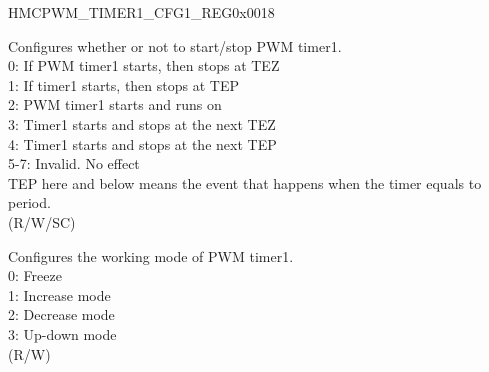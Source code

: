 \begin{register}{H}{MCPWM\_TIMER1\_CFG1\_REG}{0x0018}\label{regdesc:MCPWMTIMER1CFG1REG}
%
%
%
\regnewline%
\begin{regdesc}\begin{reglist}
\label{fielddesc:MCPWMTIMER1START}\item [MCPWM\_TIMER1\_START] Configures whether or not to start/stop PWM timer1. 
\\0: If PWM timer1 starts, then stops at TEZ
\\1: If timer1 starts, then stops at TEP
\\2: PWM timer1 starts and runs on
\\3: Timer1 starts and stops at the next TEZ
\\4: Timer1 starts and stops at the next TEP
\\5-7: Invalid. No effect
\\TEP here and below means the event that happens when the timer equals to period.
\\(R/W/SC)
\label{fielddesc:MCPWMTIMER1MOD}\item [MCPWM\_TIMER1\_MOD] Configures the working mode of PWM timer1.
\\0: Freeze
\\1: Increase mode
\\2: Decrease mode
\\3: Up-down mode
\\ (R/W)
\end{reglist}\end{regdesc}
\end{register}


